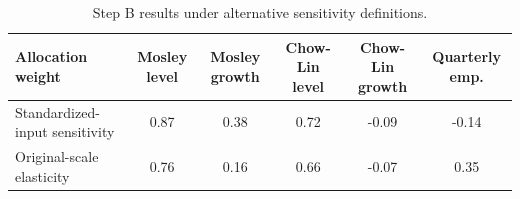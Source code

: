 \begin{table}[!htb]
\centering
\caption{Step B results under alternative sensitivity definitions.}
\label{tab:stepb_sensitivity_definition}
\small
\setlength{\tabcolsep}{4pt}
\begin{tabular}{l c c c c c}
\toprule
Allocation weight & Mosley level & Mosley growth & Chow-Lin level & Chow-Lin growth & Quarterly emp. \\
\midrule
Standardized-input sensitivity & 0.87 & 0.38 & 0.72 & -0.09 & -0.14 \\
Original-scale elasticity & 0.76 & 0.16 & 0.66 & -0.07 & 0.35 \\
\bottomrule
\end{tabular}
\end{table}
